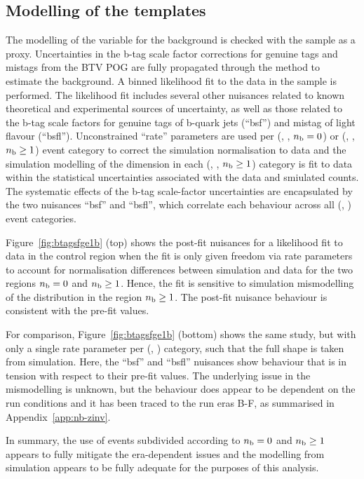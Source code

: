 \subsection{Modelling of the \texorpdfstring{\nb}{Nb} templates}
\label{sec:nb-zinv}

The modelling of the \nb variable for the \znunuj background is
checked with the \mmj sample as a proxy. Uncertainties in the b-tag
scale factor corrections for genuine tags and mistags from the BTV POG
are fully propagated through the method to estimate the \znunuj
background. A binned likelihood fit to the data in the \mmj sample is
performed. The likelihood fit includes several other nuisances related
to known theoretical and experimental sources of uncertainty, as well
as those related to the b-tag scale factors for genuine tags of
b-quark jets (``bsf'') and mistag of light flavour
(``bsfl''). Unconstrained ``rate'' parameters are used per (\njet,
\scalht, $n_{\text{b}} = 0$) or (\njet, \scalht, $n_{\text{b}} \geq 1$) event category
to correct the simulation normalisation to data and the simulation
modelling of the \nb dimension in each (\njet, \scalht, $n_{\text{b}} \geq 1$)
category is fit to data within the statistical uncertainties
associated with the data and smiulated counts. The systematic effects
of the b-tag scale-factor uncertainties are encapsulated by the two
nuisances ``bsf'' and ``bsfl'', which correlate each behaviour across
all (\njet, \scalht) event categories. 

Figure~\ref{fig:btagsfge1b} (top) shows the post-fit nuisances for a
likelihood fit to data in the \mmj control region when the fit is only
given freedom via rate parameters to account for normalisation
differences between simulation and data for the two regions $n_{\text{b}} = 0$
and $n_{\text{b}} \geq 1$. Hence, the fit is sensitive to simulation
mismodelling of the \nb distribution in the region $n_{\text{b}} \geq 1$. The
post-fit nuisance behaviour is consistent with the pre-fit values.

For comparison, Figure~\ref{fig:btagsfge1b} (bottom) shows the same
study, but with only a single rate parameter per (\njet, \scalht)
category, such that the full \nb shape is taken from simulation. Here,
the ``bsf'' and ``bsfl'' nuisances show behaviour that is in tension
with respect to their pre-fit values. The underlying issue in the
mismodelling is unknown, but the behaviour does appear to be dependent
on the run conditions and it has been traced to the run eras B-F, as
summarised in Appendix~\ref{app:nb-zinv}.

In summary, the use of \mmj events subdivided according to $n_{\text{b}} = 0$
and $n_{\text{b}} \geq 1$ appears to fully mitigate the era-dependent issues
and the \nb modelling from simulation appears to be fully adequate for
the purposes of this analysis. 

